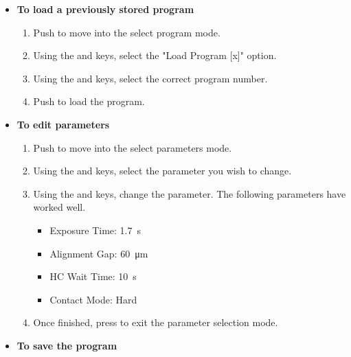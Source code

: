 \begin{enumerate}
\begin{itemize} [noitemsep, nolistsep]
  \begin{enumerate} 
    \item Push .
    \item Use the \fbox{$\uparrow$} and \fbox{$\downarrow$} keys to select a contact mode. We generally use \textbf{Hard} contact mode.
    \item Push  and move on to the edit parameters step.
  \end{enumerate}
  \item \textbf{To load a previously stored program}
  \begin{enumerate} 
    \item Push  to move into the select program mode.
    \item Using the \fbox{$\leftarrow$} and \fbox{$\rightarrow$} keys, select the "Load Program [x]" option.
    \item Using the \fbox{$\uparrow$} and \fbox{$\downarrow$} keys, select the correct program number.
    \item Push  to load the program.
  \end{enumerate}
  \item \textbf{To edit parameters}
  \begin{enumerate} 
    \item Push  to move into the select parameters mode.
    \item Using the \fbox{$\leftarrow$} and \fbox{$\rightarrow$} keys, select the parameter you wish to change.
    \item Using the \fbox{$\uparrow$} and \fbox{$\downarrow$} keys, change the parameter. The following parameters
          have worked well.
    \begin{itemize} [noitemsep, nolistsep]
      \item Exposure Time: \SI{1.7}{\second}
      \item Alignment Gap: \SI{60}{\micro\meter}
      \item HC Wait Time: \SI{10}{\second}
      \item Contact Mode: Hard
    \end{itemize}
    \item Once finished, press  to exit the parameter selection mode.
  \end{enumerate}
  \item \textbf{To save the program}
  \begin{enumerate} 

\end{enumerate}
\end{itemize}
\end{enumerate}
